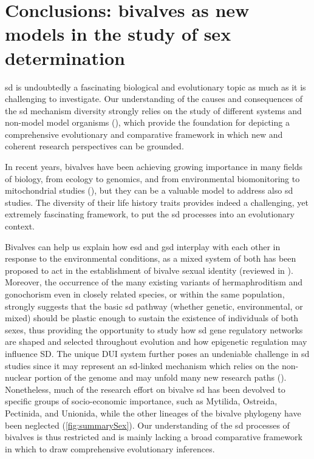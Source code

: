 \section{Conclusions: bivalves as new models in the study of sex determination}
\gls{sd} is undoubtedly a fascinating biological and evolutionary topic as much as it is challenging to investigate. Our understanding of the causes and consequences of the \gls{sd} mechanism diversity strongly relies on the study of different systems and non-model model organisms (), which provide the foundation for depicting a comprehensive evolutionary and comparative framework in which new and coherent research perspectives can be grounded.

In recent years, bivalves have been achieving growing importance in many fields of biology, from ecology to genomics, and from environmental biomonitoring to mitochondrial studies (), but they can be a valuable model to address also \gls{sd} studies. The diversity of their life history traits provides indeed a challenging, yet extremely fascinating framework, to put the \gls{sd} processes into an evolutionary context.

Bivalves can help us explain how \gls{esd} and \gls{gsd} interplay with each other in response to the environmental conditions, as a mixed system of both has been proposed to act in the establishment of bivalve sexual identity (reviewed in ). Moreover, the occurrence of the many existing variants of hermaphroditism and gonochorism even in closely related species, or within the same population, strongly suggests that the basic \gls{sd} pathway (whether genetic, environmental, or mixed) should be plastic enough to sustain the existence of individuals of both sexes, thus providing the opportunity to study how \gls{sd} gene regulatory networks are shaped and selected throughout evolution and how epigenetic regulation may influence SD. The unique DUI system further poses an undeniable challenge in \gls{sd} studies since it may represent an \gls{sd}-linked mechanism which relies on the non-nuclear portion of the genome and may unfold many new research paths (). Nonetheless, much of the research effort on bivalve \gls{sd} has been devolved to specific groups of socio-economic importance, such as Mytilida, Ostreida, Pectinida, and Unionida, while the other lineages of the bivalve phylogeny have been neglected (\cref{fig:summarySex}). Our understanding of the \gls{sd} processes of bivalves is thus restricted and is mainly lacking a broad comparative framework in which to draw comprehensive evolutionary inferences.

